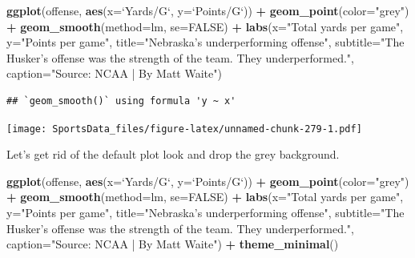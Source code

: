 \documentclass[
]{book}
\newenvironment{Shaded}{\begin{snugshade}}{\end{snugshade}}
\newcommand{\DataTypeTok}[1]{\textcolor[rgb]{0.13,0.29,0.53}{#1}}
\newcommand{\KeywordTok}[1]{\textcolor[rgb]{0.13,0.29,0.53}{\textbf{#1}}}
\newcommand{\NormalTok}[1]{#1}
\newcommand{\OperatorTok}[1]{\textcolor[rgb]{0.81,0.36,0.00}{\textbf{#1}}}
\newcommand{\OtherTok}[1]{\textcolor[rgb]{0.56,0.35,0.01}{#1}}
\newcommand{\StringTok}[1]{\textcolor[rgb]{0.31,0.60,0.02}{#1}}
\begin{document}
\begin{Shaded}
\begin{Highlighting}[]
\KeywordTok{ggplot}\NormalTok{(offense, }\KeywordTok{aes}\NormalTok{(}\DataTypeTok{x=}\StringTok{`}\DataTypeTok{Yards/G}\StringTok{`}\NormalTok{, }\DataTypeTok{y=}\StringTok{`}\DataTypeTok{Points/G}\StringTok{`}\NormalTok{)) }\OperatorTok{+}\StringTok{ }
\StringTok{  }\KeywordTok{geom_point}\NormalTok{(}\DataTypeTok{color=}\StringTok{"grey"}\NormalTok{) }\OperatorTok{+}\StringTok{ }\KeywordTok{geom_smooth}\NormalTok{(}\DataTypeTok{method=}\NormalTok{lm, }\DataTypeTok{se=}\OtherTok{FALSE}\NormalTok{) }\OperatorTok{+}\StringTok{ }
\StringTok{  }\KeywordTok{labs}\NormalTok{(}\DataTypeTok{x=}\StringTok{"Total yards per game"}\NormalTok{, }\DataTypeTok{y=}\StringTok{"Points per game"}\NormalTok{, }\DataTypeTok{title=}\StringTok{"Nebraska's underperforming offense"}\NormalTok{, }\DataTypeTok{subtitle=}\StringTok{"The Husker's offense was the strength of the team. They underperformed."}\NormalTok{, }\DataTypeTok{caption=}\StringTok{"Source: NCAA | By Matt Waite"}\NormalTok{)}
\end{Highlighting}
\end{Shaded}

\begin{verbatim}
## `geom_smooth()` using formula 'y ~ x'
\end{verbatim}

\texttt{[image: SportsData\_files/figure-latex/unnamed-chunk-279-1.pdf]}

Let's get rid of the default plot look and drop the grey background.

\begin{Shaded}
\begin{Highlighting}[]
\KeywordTok{ggplot}\NormalTok{(offense, }\KeywordTok{aes}\NormalTok{(}\DataTypeTok{x=}\StringTok{`}\DataTypeTok{Yards/G}\StringTok{`}\NormalTok{, }\DataTypeTok{y=}\StringTok{`}\DataTypeTok{Points/G}\StringTok{`}\NormalTok{)) }\OperatorTok{+}\StringTok{ }
\StringTok{  }\KeywordTok{geom_point}\NormalTok{(}\DataTypeTok{color=}\StringTok{"grey"}\NormalTok{) }\OperatorTok{+}\StringTok{ }\KeywordTok{geom_smooth}\NormalTok{(}\DataTypeTok{method=}\NormalTok{lm, }\DataTypeTok{se=}\OtherTok{FALSE}\NormalTok{) }\OperatorTok{+}\StringTok{ }
\StringTok{  }\KeywordTok{labs}\NormalTok{(}\DataTypeTok{x=}\StringTok{"Total yards per game"}\NormalTok{, }\DataTypeTok{y=}\StringTok{"Points per game"}\NormalTok{, }\DataTypeTok{title=}\StringTok{"Nebraska's underperforming offense"}\NormalTok{, }\DataTypeTok{subtitle=}\StringTok{"The Husker's offense was the strength of the team. They underperformed."}\NormalTok{, }\DataTypeTok{caption=}\StringTok{"Source: NCAA | By Matt Waite"}\NormalTok{) }\OperatorTok{+}\StringTok{ }
\StringTok{  }\KeywordTok{theme_minimal}\NormalTok{()}
\end{Highlighting}
\end{Shaded}
\end{document}
